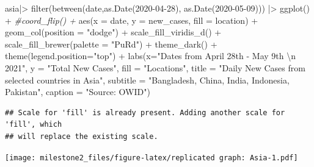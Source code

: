 \documentclass[
]{article}
\newenvironment{Shaded}{\begin{snugshade}}{\end{snugshade}}
\newcommand{\AttributeTok}[1]{\textcolor[rgb]{0.77,0.63,0.00}{#1}}
\newcommand{\CommentTok}[1]{\textcolor[rgb]{0.56,0.35,0.01}{\textit{#1}}}
\newcommand{\FunctionTok}[1]{\textcolor[rgb]{0.00,0.00,0.00}{#1}}
\newcommand{\NormalTok}[1]{#1}
\newcommand{\SpecialCharTok}[1]{\textcolor[rgb]{0.00,0.00,0.00}{#1}}
\newcommand{\StringTok}[1]{\textcolor[rgb]{0.31,0.60,0.02}{#1}}
\begin{document}
\begin{Shaded}
\begin{Highlighting}[]
\NormalTok{asia}\SpecialCharTok{|\textgreater{}}
  \FunctionTok{filter}\NormalTok{(}\FunctionTok{between}\NormalTok{(date,}\FunctionTok{as.Date}\NormalTok{(}\StringTok{\textquotesingle{}2020{-}04{-}28\textquotesingle{}}\NormalTok{), }\FunctionTok{as.Date}\NormalTok{(}\StringTok{\textquotesingle{}2020{-}05{-}09\textquotesingle{}}\NormalTok{))) }\SpecialCharTok{|\textgreater{}}
  \FunctionTok{ggplot}\NormalTok{() }\SpecialCharTok{+}
  \CommentTok{\#coord\_flip() +}
  \FunctionTok{aes}\NormalTok{(}\AttributeTok{x =}\NormalTok{ date, }\AttributeTok{y =}\NormalTok{ new\_cases, }\AttributeTok{fill =}\NormalTok{ location) }\SpecialCharTok{+}
  \FunctionTok{geom\_col}\NormalTok{(}\AttributeTok{position =} \StringTok{"dodge"}\NormalTok{) }\SpecialCharTok{+}
  \FunctionTok{scale\_fill\_viridis\_d}\NormalTok{() }\SpecialCharTok{+}
  \FunctionTok{scale\_fill\_brewer}\NormalTok{(}\AttributeTok{palette =} \StringTok{"PuRd"}\NormalTok{) }\SpecialCharTok{+}
  \FunctionTok{theme\_dark}\NormalTok{() }\SpecialCharTok{+}
  \FunctionTok{theme}\NormalTok{(}\AttributeTok{legend.position=}\StringTok{"top"}\NormalTok{) }\SpecialCharTok{+}
  \FunctionTok{labs}\NormalTok{(}\AttributeTok{x=}\StringTok{"Dates from April 28th {-} May 9th }\SpecialCharTok{\textbackslash{}n}\StringTok{ 2021"}\NormalTok{,}
       \AttributeTok{y =} \StringTok{"Total New Cases"}\NormalTok{,}
       \AttributeTok{fill =} \StringTok{"Locations"}\NormalTok{,}
       \AttributeTok{title =} \StringTok{"Daily New Cases from selected countries in Asia"}\NormalTok{,}
       \AttributeTok{subtitle =} \StringTok{"Bangladesh, China, India, Indonesia, Pakistan"}\NormalTok{,}
       \AttributeTok{caption =} \StringTok{"Source: OWID"}\NormalTok{)}
\end{Highlighting}
\end{Shaded}

\begin{verbatim}
## Scale for 'fill' is already present. Adding another scale for 'fill', which
## will replace the existing scale.
\end{verbatim}

\texttt{[image: milestone2\_files/figure-latex/replicated graph: Asia-1.pdf]}
\end{document}
